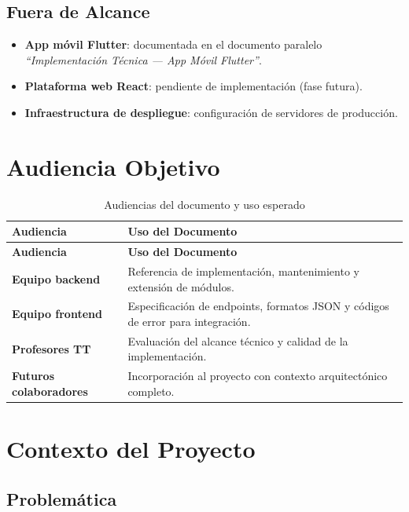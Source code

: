 \subsection{Fuera de Alcance}

\begin{itemize}[leftmargin=1.5cm]
  \item \textbf{App móvil Flutter}: documentada en el documento paralelo \textit{``Implementación Técnica --- App Móvil Flutter''}.
  \item \textbf{Plataforma web React}: pendiente de implementación (fase futura).
  \item \textbf{Infraestructura de despliegue}: configuración de servidores de producción.
\end{itemize}

\section{Audiencia Objetivo}

\begin{longtable}{>{\bfseries}p{3.5cm} p{10cm}}
  \caption{Audiencias del documento y uso esperado}
  \label{tab:audiencia} \\
  \toprule
  \textbf{Audiencia} & \textbf{Uso del Documento} \\
  \midrule
  \endfirsthead
  \toprule
  \textbf{Audiencia} & \textbf{Uso del Documento} \\
  \midrule
  \endhead
  Equipo backend     & Referencia de implementación, mantenimiento y extensión de módulos. \\
  \addlinespace
  Equipo frontend    & Especificación de endpoints, formatos JSON y códigos de error para integración. \\
  \addlinespace
  Profesores TT      & Evaluación del alcance técnico y calidad de la implementación. \\
  \addlinespace
  Futuros colaboradores & Incorporación al proyecto con contexto arquitectónico completo. \\
  \bottomrule
\end{longtable}

\section{Contexto del Proyecto}

\subsection{Problemática}

